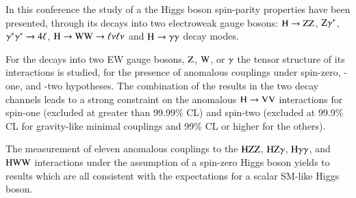 In this conference the study of a the Higgs boson spin-parity
properties have been presented, through its decays into two
electroweak gauge bosons: $\mathrm{H}\to\mathrm{Z}\mathrm{Z}$, $\mathrm{Z} \gamma^*$,
$\gamma^*\gamma^*\to4\ell$, $\mathrm{H}\to\mathrm{W}\mathrm{W}\to\ell\nu\ell\nu$ and
$\mathrm{H}\to\gamma\gamma$ decay modes.

For the decays into two EW gauge bosons, $\mathrm{Z}$, $\mathrm{W}$, or $\gamma$ the
tensor structure of its interactions is studied, for the presence of
anomalous couplings under spin-zero, -one, and -two hypotheses. The
combination of the results in the two decay channels leads to a strong
constraint on the anomalous $\mathrm{H}\to\mathrm{V}\mathrm{V}$ interactions for spin-one
(excluded at greater than 99.99\% CL) and spin-two (excluded at 99.9\%
CL for gravity-like minimal couplings and 99\% CL or higher for the
others).

The measurement of eleven anomalous couplings to the $\mathrm{H}\mathrm{Z}\mathrm{Z}$,
$\mathrm{H}\mathrm{Z}\gamma$, $\mathrm{H}\gamma\gamma$, and $\mathrm{H}\mathrm{W}\mathrm{W}$ interactions under the
assumption of a spin-zero Higgs boson yields to results which are all
consistent with the expectations for a scalar SM-like Higgs boson.

